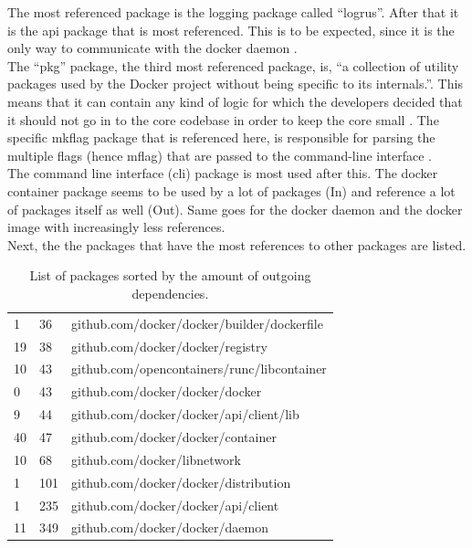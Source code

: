 The most referenced package is the logging package called ``logrus''. After that it is the api package that is most referenced. This is to be expected, since it is the only way to communicate with the docker daemon \cite{dockerapi}. \\
The ``pkg'' package, the third most referenced package, is, ``a collection of utility packages used by the Docker project without being specific to its internals.''. This means that it can contain any kind of logic for which the developers decided that it should not go in to the core codebase in order to keep the core small \cite{dockerpkg}. The specific mkflag package that is referenced here, is responsible for parsing the multiple flags (hence mflag) that are passed to the command-line interface \cite{dockermflag}. \\
The command line interface (cli) package is most used after this. The docker container package seems to be used by a lot of packages (In) and reference a lot of packages itself as well (Out). Same goes for the docker daemon and the docker image with increasingly less references. \\
Next, the the packages that have the most references to other packages are listed.

\begin{table}
\label{tab:deptablehighestin}
\caption{List of packages sorted by the amount of outgoing dependencies.}

\begin{tabular}{l l l}
1 & 36 & github.com/docker/docker/builder/dockerfile \\
19 & 38 & github.com/docker/docker/registry \\
10 & 43 & github.com/opencontainers/runc/libcontainer \\
0 & 43 & github.com/docker/docker/docker \\
9 & 44 & github.com/docker/docker/api/client/lib \\
40 & 47 & github.com/docker/docker/container \\
10 & 68 & github.com/docker/libnetwork \\
1 & 101 & github.com/docker/docker/distribution \\
1 & 235 & github.com/docker/docker/api/client \\
11 & 349 & github.com/docker/docker/daemon \\
\end{tabular}
\end{table}

